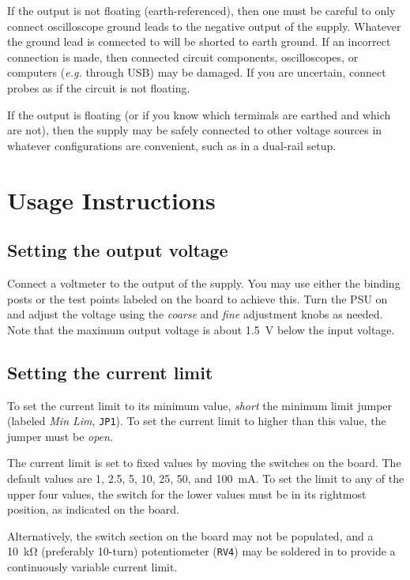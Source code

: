 \documentclass[letterpaper,twocolumn,11pt]{article}
\newcommand{\refdes}[1]{\texttt{#1}}
\begin{document}
If the output is not floating (earth-referenced), then one must be careful to
only connect oscilloscope ground leads to the negative output of the supply.
Whatever the ground lead is connected to will be shorted to earth ground. If an
incorrect connection is made, then connected circuit components, oscilloscopes,
or computers (\textit{e.g.} through USB) may be damaged. If you are uncertain,
connect probes as if the circuit is not floating.

If the output is floating (or if you know which terminals are earthed and which
are not), then the supply may be safely connected to other voltage sources in
whatever configurations are convenient, such as in a dual-rail setup.

\section{Usage Instructions}

\subsection{Setting the output voltage}

Connect a voltmeter to the output of the supply. You may use either the binding
posts or the test points labeled on the board to achieve this. Turn the PSU on
and adjust the voltage using the \emph{coarse} and \emph{fine} adjustment knobs
as needed. Note that the maximum output voltage is about \SI{1.5}{\V} below the
input voltage.

\subsection{Setting the current limit}\label{sec:set_limit}

To set the current limit to its minimum value, \emph{short} the minimum limit
jumper (labeled \emph{Min Lim}, \refdes{JP1}). To set the current limit to
higher than this value, the jumper must be \emph{open}.

The current limit is set to fixed values by moving the switches on the
board. The default values are 1, 2.5, 5, 10, 25, 50, and \SI{100}{\mA}. To set
the limit to any of the upper four values, the switch for the lower values must
be in its rightmost position, as indicated on the board.

Alternatively, the switch section on the board may not be populated, and a
\SI{10}{\kohm} (preferably 10-turn) potentiometer (\refdes{RV4}) may be
soldered in to provide a continuously variable current limit.
\end{document}
